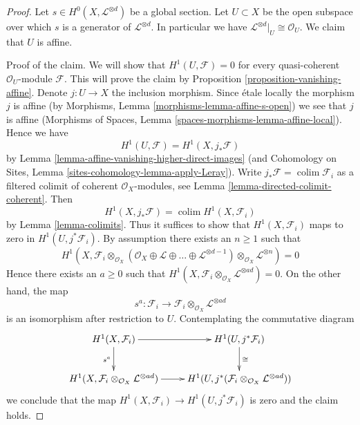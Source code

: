 \documentclass{stacks-project}
\theoremstyle{plain}
\theoremstyle{definition}
\theoremstyle{remark}
\numberwithin{equation}{subsection}
\def\colim{\mathop{\mathrm{colim}}\nolimits}
\begin{document}
\begin{proof}
Let $s \in H^0(X, \mathcal{L}^{\otimes d})$ be a global section.
Let $U \subset X$ be the open subspace over which $s$ is a generator
of $\mathcal{L}^{\otimes d}$. In particular we have
$\mathcal{L}^{\otimes d}|_U \cong \mathcal{O}_U$.
We claim that $U$ is affine.

\medskip\noindent
Proof of the claim. We will show that $H^1(U, \mathcal{F}) = 0$
for every quasi-coherent $\mathcal{O}_U$-module $\mathcal{F}$.
This will prove the claim by Proposition \ref{proposition-vanishing-affine}.
Denote $j : U \to X$ the inclusion morphism.
Since \'etale locally the morphism $j$ is affine
(by Morphisms, Lemma \ref{morphisms-lemma-affine-s-open})
we see that $j$ is affine (Morphisms of Spaces, Lemma
\ref{spaces-morphisms-lemma-affine-local}).
Hence we have
$$
H^1(U, \mathcal{F}) = H^1(X, j_*\mathcal{F})
$$
by Lemma \ref{lemma-affine-vanishing-higher-direct-images}
(and Cohomology on Sites, Lemma \ref{sites-cohomology-lemma-apply-Leray}).
Write $j_*\mathcal{F} = \colim \mathcal{F}_i$ as a filtered colimit
of coherent $\mathcal{O}_X$-modules, see
Lemma \ref{lemma-directed-colimit-coherent}. Then
$$
H^1(X, j_*\mathcal{F}) = \colim H^1(X, \mathcal{F}_i)
$$
by Lemma \ref{lemma-colimits}.
Thus it suffices to show that $H^1(X, \mathcal{F}_i)$ maps
to zero in $H^1(U, j^*\mathcal{F}_i)$. By assumption there exists
an $n \geq 1$ such that
$$
H^1(X,
\mathcal{F}_i \otimes_{\mathcal{O}_X}
(\mathcal{O}_X \oplus \mathcal{L} \oplus \ldots
\oplus \mathcal{L}^{\otimes d - 1})
\otimes_{\mathcal{O}_X} \mathcal{L}^{\otimes n}) = 0
$$
Hence there exists an $a \geq 0$ such that
$H^1(X, \mathcal{F}_i \otimes_{\mathcal{O}_X} \mathcal{L}^{\otimes ad}) = 0$.
On the other hand, the map
$$
s^a : \mathcal{F}_i \longrightarrow
\mathcal{F}_i \otimes_{\mathcal{O}_X} \mathcal{L}^{\otimes ad}
$$
is an isomorphism after restriction to $U$. Contemplating the
commutative diagram
$$
\xymatrix{
H^1(X, \mathcal{F}_i) \ar[r] \ar[d]_{s^a} & H^1(U, j^*\mathcal{F}_i)
\ar[d]^{\cong} \\
H^1(X, \mathcal{F}_i \otimes_{\mathcal{O}_X} \mathcal{L}^{\otimes ad}) \ar[r] &
H^1(U,
j^*(\mathcal{F}_i \otimes_{\mathcal{O}_X} \mathcal{L}^{\otimes ad}))
}
$$
we conclude that the map  $H^1(X, \mathcal{F}_i) \to H^1(U, j^*\mathcal{F}_i)$
is zero and the claim holds.


\end{proof}
\end{document}
